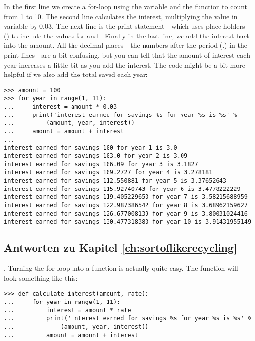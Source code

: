 In the first line we create a for-loop using the variable  and the function  to count from 1 to 10.  The second line calculates the interest, multiplying the value in variable  by 0.03.  The next line is the print statement---which uses place holders () to include the values for  and .  Finally in the last line, we add the interest back into the amount.
All the decimal places---the numbers after the period (.) in the print lines---are a bit confusing, but you can tell that the amount of interest each year increases a little bit as you add the interest.
The code might be a bit more helpful if we also add the total saved each year:

\begin{listing}
\begin{verbatim}
>>> amount = 100
>>> for year in range(1, 11):
...     interest = amount * 0.03
...     print('interest earned for savings %s for year %s is %s' % 
...         (amount, year, interest))
...     amount = amount + interest
... 
interest earned for savings 100 for year 1 is 3.0
interest earned for savings 103.0 for year 2 is 3.09
interest earned for savings 106.09 for year 3 is 3.1827
interest earned for savings 109.2727 for year 4 is 3.278181
interest earned for savings 112.550881 for year 5 is 3.37652643
interest earned for savings 115.92740743 for year 6 is 3.4778222229
interest earned for savings 119.405229653 for year 7 is 3.58215688959
interest earned for savings 122.987386542 for year 8 is 3.68962159627
interest earned for savings 126.677008139 for year 9 is 3.80031024416
interest earned for savings 130.477318383 for year 10 is 3.91431955149
\end{verbatim}
\end{listing}

\subsection*{Antworten zu Kapitel \ref{ch:sortoflikerecycling}}

. Turning the for-loop into a function is actually quite easy.  The function will look something like this:

\begin{listing}
\begin{verbatim}
>>> def calculate_interest(amount, rate):
...     for year in range(1, 11):
...         interest = amount * rate
...         print('interest earned for savings %s for year %s is %s' % 
...             (amount, year, interest))
...         amount = amount + interest
\end{verbatim}
\end{listing}

